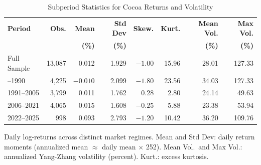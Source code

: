 \begin{table}[htbp]
\centering
\caption{Subperiod Statistics for Cocoa Returns and Volatility}
\label{tab:subperiod-stats}
\small
\begin{tabular}{lrrrrrrr}
\toprule
\textbf{Period} & \textbf{Obs.} & \textbf{Mean} & \textbf{Std Dev} & \textbf{Skew.} & \textbf{Kurt.} & \textbf{Mean Vol.} & \textbf{Max Vol.} \\
 & & \textbf{(\%)} & \textbf{(\%)} & & & \textbf{(\%)} & \textbf{(\%)} \\
\midrule
Full Sample & 13,087 & 0.012 & 1.929 & $-1.00$ & 15.96 & 28.01 & 127.33 \\
\addlinespace
1974--1990 & 4,225 & $-0.010$ & 2.099 & $-1.80$ & 23.56 & 34.03 & 127.33 \\
1991--2005 & 3,799 & 0.011 & 1.762 & 0.28 & 2.80 & 24.14 & 49.63 \\
2006--2021 & 4,065 & 0.015 & 1.608 & $-0.25$ & 5.88 & 23.38 & 53.94 \\
2022--2025 & 998 & 0.093 & 2.793 & $-1.20$ & 10.42 & 36.20 & 109.76 \\
\bottomrule
\end{tabular}
\begin{tablenotes}
\small
\item Daily log-returns across distinct market regimes. Mean and Std Dev: daily return moments (annualized mean $\approx$ daily mean $\times$ 252). Mean Vol.\ and Max Vol.: annualized Yang-Zhang volatility (percent). Kurt.: excess kurtosis.
\end{tablenotes}
\end{table}
